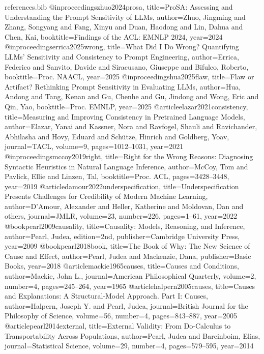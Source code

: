 \begin{filecontents*}[overwrite]{references.bib}
@inproceedings{zhuo2024prosa,
  title={{ProSA}: Assessing and Understanding the Prompt Sensitivity of {LLMs}},
  author={Zhuo, Jingming and Zhang, Songyang and Fang, Xinyu and Duan, Haodong and Lin, Dahua and Chen, Kai},
  booktitle={Findings of the ACL: EMNLP 2024}, year={2024}}
@inproceedings{errica2025wrong,
  title={What Did {I} Do Wrong? Quantifying {LLMs}' Sensitivity and Consistency to Prompt Engineering},
  author={Errica, Federico and Sanvito, Davide and Siracusano, Giuseppe and Bifulco, Roberto},
  booktitle={Proc. NAACL}, year={2025}}
@inproceedings{hua2025flaw,
  title={Flaw or Artifact? Rethinking Prompt Sensitivity in Evaluating {LLMs}},
  author={Hua, Andong and Tang, Kenan and Gu, Chenhe and Gu, Jindong and Wong, Eric and Qin, Yao},
  booktitle={Proc. EMNLP}, year={2025}}
@article{elazar2021consistency,
  title={Measuring and Improving Consistency in Pretrained Language Models},
  author={Elazar, Yanai and Kassner, Nora and Ravfogel, Shauli and Ravichander, Abhilasha and Hovy, Eduard and Sch{\"u}tze, Hinrich and Goldberg, Yoav},
  journal={TACL}, volume={9}, pages={1012--1031}, year={2021}}
@inproceedings{mccoy2019right,
  title={Right for the Wrong Reasons: Diagnosing Syntactic Heuristics in Natural Language Inference},
  author={McCoy, Tom and Pavlick, Ellie and Linzen, Tal}, booktitle={Proc. ACL}, pages={3428--3448}, year={2019}}
@article{damour2022underspecification,
  title={Underspecification Presents Challenges for Credibility of Modern Machine Learning},
  author={D'Amour, Alexander and Heller, Katherine and Moldovan, Dan and others}, journal={JMLR}, volume={23}, number={226}, pages={1--61}, year={2022}}
@book{pearl2009causality, title={Causality: Models, Reasoning, and Inference}, author={Pearl, Judea}, edition={2nd}, publisher={Cambridge University Press}, year={2009}}
@book{pearl2018book, title={The Book of Why: The New Science of Cause and Effect}, author={Pearl, Judea and Mackenzie, Dana}, publisher={Basic Books}, year={2018}}
@article{mackie1965causes, title={Causes and Conditions}, author={Mackie, John L.}, journal={American Philosophical Quarterly}, volume={2}, number={4}, pages={245--264}, year={1965}}
@article{halpern2005causes, title={Causes and Explanations: A Structural-Model Approach. Part {I}: Causes}, author={Halpern, Joseph Y. and Pearl, Judea}, journal={British Journal for the Philosophy of Science}, volume={56}, number={4}, pages={843--887}, year={2005}}
@article{pearl2014external, title={External Validity: From Do-Calculus to Transportability Across Populations}, author={Pearl, Judea and Bareinboim, Elias}, journal={Statistical Science}, volume={29}, number={4}, pages={579--595}, year={2014}}

\end{filecontents*}

